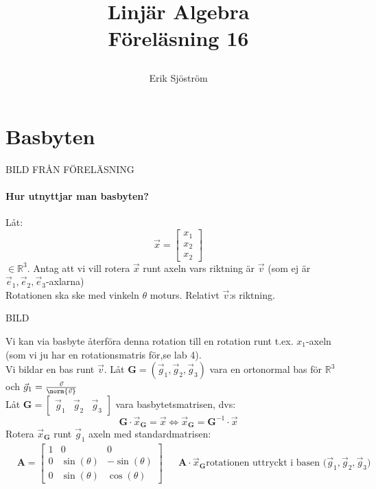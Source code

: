 

\title{
	 Linjär Algebra\\
	 Föreläsning 16
    \author{Erik Sjöström}
}

\maketitle

\section{Basbyten} %
\label{sec:basbyten}
\begin{center}
	BILD FRÅN FÖRELÄSNING
\end{center}

\paragraph{Hur utnyttjar man basbyten?} %
\label{par:hur_utnyttjar_man_basbyten_}
Låt:
\[
\vec{x} = \begin{bmatrix} x_1\\x_2\\x_2 \end{bmatrix}
\]
$\in \mathbb{R}^3$. Antag att vi vill rotera $\vec{x}$ runt axeln vars riktning är $\vec{v}$ (som ej är $\vec{e}_1, \vec{e}_2, \vec{e}_3$-axlarna)\\
Rotationen ska ske med vinkeln $\theta$ moturs. Relativt $\vec{v}$:s riktning.
\begin{center}
	BILD		
\end{center}
Vi kan via basbyte återföra denna rotation till en rotation runt t.ex. $x_1$-axeln (som vi ju har en rotationsmatris för,se lab 4).\\
Vi bildar en bas runt $\vec{v}$. Låt $\mathbf{G} = (\vec{g}_1, \vec{g}_2, \vec{g}_3)$ vara en ortonormal bas för $\mathbb{R}^3$ och $\vec{g}_1 = \frac{\vec{v}}{\norm{\vec{v}}}$\\
Låt $\mathbf{G} = \begin{bmatrix} \vec{g}_1&\vec{g}_2&\vec{g}_3 \end{bmatrix}$ vara basbytetsmatrisen, dvs:
\[
\mathbf{G} \cdot \vec{x}_{\mathbf{G}} = \vec{x} \Leftrightarrow \vec{x}_{\mathbf{G}} = \mathbf{G}^{-1} \cdot \vec{x}
\]
Rotera $\vec{x}_{\mathbf{G}}$ runt $\vec{g}_1$ axeln med standardmatrisen:
\begin{align*}
&\mathbf{A} = \begin{bmatrix} 1&0&0\\0&\sin(\theta)&-\sin(\theta)\\0&\sin(\theta)&\cos(\theta) \end{bmatrix}
&&\mathbf{A} \cdot \vec{x}_{\mathbf{G}} \mbox{rotationen uttryckt i basen ($\vec{g}_1, \vec{g}_2, \vec{g}_3$)}
\end{align*}
